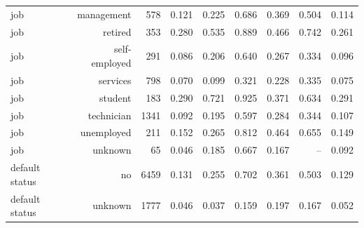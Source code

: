 \begin{tabular}{lrrrrrrrr}
job & management & 578 & 0.121 & 0.225 & 0.686 & 0.369 & 0.504 & 0.114 \\
job & retired & 353 & 0.280 & 0.535 & 0.889 & 0.466 & 0.742 & 0.261 \\
job & self-employed & 291 & 0.086 & 0.206 & 0.640 & 0.267 & 0.334 & 0.096 \\
job & services & 798 & 0.070 & 0.099 & 0.321 & 0.228 & 0.335 & 0.075 \\
job & student & 183 & 0.290 & 0.721 & 0.925 & 0.371 & 0.634 & 0.291 \\
job & technician & 1341 & 0.092 & 0.195 & 0.597 & 0.284 & 0.344 & 0.107 \\
job & unemployed & 211 & 0.152 & 0.265 & 0.812 & 0.464 & 0.655 & 0.149 \\
job & unknown & 65 & 0.046 & 0.185 & 0.667 & 0.167 & -- & 0.092 \\
default status & no & 6459 & 0.131 & 0.255 & 0.702 & 0.361 & 0.503 & 0.129 \\
default status & unknown & 1777 & 0.046 & 0.037 & 0.159 & 0.197 & 0.167 & 0.052 \\
\bottomrule
\end{tabular}